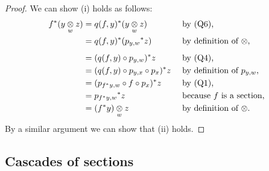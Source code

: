 \begin{proof}
We can show (i) holds as follows: 
\begin{align*}
f^*(\yz) &= q(f,y)^*(\yz)                           &&\mbox{ by (Q6),}                \\
          &= q(f,y)^*({p_{y,w}} ^* z)               &&\mbox{ by definition of $\crossx{}{}{}$,}              \\
          &= (q(f,y)\circ p_{y,w}) ^* z             &&\mbox{ by (Q4),}                         \\
          &= (q(f,y) \circ p_{y,x} \circ p_x ) ^* z &&\mbox{ by definition of $p_{y,w}$,}      \\
          &= (p_{f^*y,w} \circ f \circ p_x ) ^* z   &&\mbox{ by (Q1),} \\
          &= {p_{f^*y,w}}^*z                        &&\mbox{ because $f$ is a section,}                   \\
          &= \crossx{(f^*y)}{z}{w}                  &&\mbox{ by definition of $\crossx{}{}{}$.}
\end{align*}
By a similar argument we can show that (ii) holds.
\end{proof}




\subsection{Cascades of sections}




